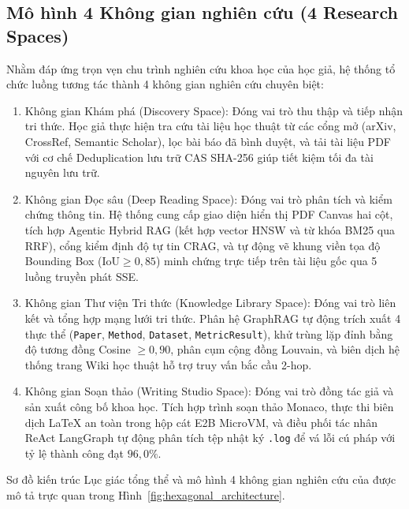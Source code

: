 \subsection{Mô hình 4 Không gian nghiên cứu (4 Research Spaces)}
\label{subsec:bon_khong_gian}

Nhằm đáp ứng trọn vẹn chu trình nghiên cứu khoa học của học giả, hệ thống tổ chức luồng tương tác thành 4 không gian nghiên cứu chuyên biệt:
\begin{enumerate}
    \item Không gian Khám phá (Discovery Space): Đóng vai trò thu thập và tiếp nhận tri thức. Học giả thực hiện tra cứu tài liệu học thuật từ các cổng mở (arXiv, CrossRef, Semantic Scholar), lọc bài báo đã bình duyệt, và tải tài liệu PDF với cơ chế Deduplication lưu trữ CAS SHA-256 giúp tiết kiệm tối đa tài nguyên lưu trữ.
    \item Không gian Đọc sâu (Deep Reading Space): Đóng vai trò phân tích và kiểm chứng thông tin. Hệ thống cung cấp giao diện hiển thị PDF Canvas hai cột, tích hợp Agentic Hybrid RAG (kết hợp vector HNSW và từ khóa BM25 qua RRF), cổng kiểm định độ tự tin CRAG, và tự động vẽ khung viền tọa độ Bounding Box ($\text{IoU} \ge 0{,}85$) minh chứng trực tiếp trên tài liệu gốc qua 5 luồng truyền phát SSE.
    \item Không gian Thư viện Tri thức (Knowledge Library Space): Đóng vai trò liên kết và tổng hợp mạng lưới tri thức. Phân hệ GraphRAG tự động trích xuất 4 thực thể (\texttt{Paper}, \texttt{Method}, \texttt{Dataset}, \texttt{MetricResult}), khử trùng lặp đỉnh bằng độ tương đồng Cosine $\ge 0{,}90$, phân cụm cộng đồng Louvain, và biên dịch hệ thống trang Wiki học thuật hỗ trợ truy vấn bắc cầu 2-hop.
    \item Không gian Soạn thảo (Writing Studio Space): Đóng vai trò đồng tác giả và sản xuất công bố khoa học. Tích hợp trình soạn thảo Monaco, thực thi biên dịch LaTeX an toàn trong hộp cát E2B MicroVM, và điều phối tác nhân ReAct LangGraph tự động phân tích tệp nhật ký \texttt{.log} để vá lỗi cú pháp với tỷ lệ thành công đạt $96{,}0\%$.
\end{enumerate}

Sơ đồ kiến trúc Lục giác tổng thể và mô hình 4 không gian nghiên cứu của \VS được mô tả trực quan trong Hình~\ref{fig:hexagonal_architecture}.


